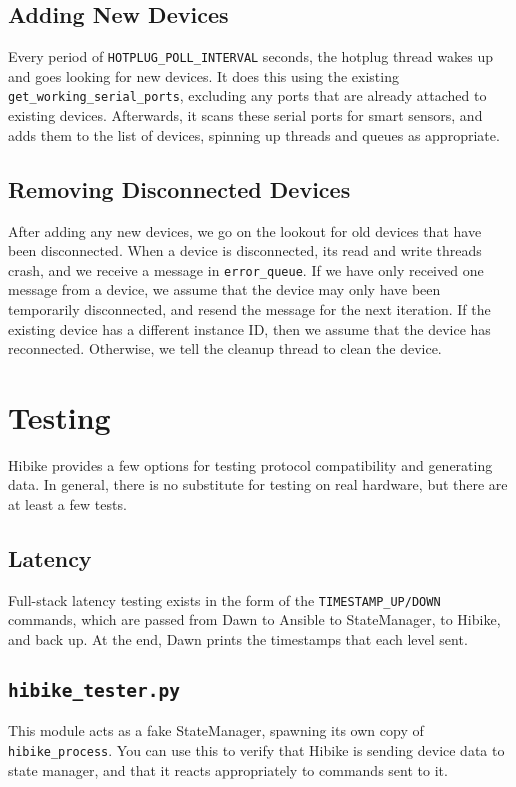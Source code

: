 \documentclass[12pt]{book}
\begin{document}
\subsection{Adding New Devices}
Every period of \texttt{HOTPLUG\_POLL\_INTERVAL} seconds, the hotplug thread
wakes up and goes looking for new devices. It does this using the existing
\texttt{get\_working\_serial\_ports}, excluding any ports that are already
attached to existing devices. Afterwards, it scans these serial ports for smart
sensors, and adds them to the list of devices, spinning up threads and queues
as appropriate.

\subsection{Removing Disconnected Devices}
After adding any new devices, we go on the lookout for old devices that
have been disconnected. When a device is disconnected, its read and
write threads crash, and we receive a message in \texttt{error\_queue}.
If we have only received one message from a device, we assume that the device may only
have been temporarily disconnected, and resend the message for the next iteration.
If the existing device has a different instance ID, then we assume
that the device has reconnected.
Otherwise, we tell the cleanup thread to clean the device.

\section{Testing}
Hibike provides a few options for testing protocol compatibility
and generating data. In general, there is no substitute for testing on real
hardware, but there are at least a few tests.

\subsection{Latency}
Full-stack latency testing exists in the form of the \texttt{TIMESTAMP\_UP/DOWN}
commands, which are passed from Dawn to Ansible to StateManager, to Hibike,
and back up. At the end, Dawn prints the timestamps that each level sent.

\subsection{\texttt{hibike\_tester.py}}
This module acts as a fake StateManager, spawning its own
copy of \texttt{hibike\_process}. You can use this to verify
that Hibike is sending device data to state manager, and that
it reacts appropriately to commands sent to it.
\end{document}
